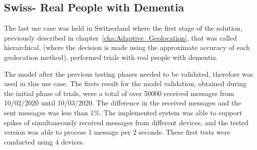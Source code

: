 \subsection{Swiss- Real People with Dementia} %
\label{subsec:Use_case_Swiss}


The last use case was held in Switzerland where the first stage of the solution, previously described in chapter~\ref{cha:Adaptive_Geolocation}, that was called hierarchical, (where the decision is made using the approximate accuracy of each geolocation method), performed trials with real people with dementia. 

The model after the previous testing phases  needed to be validated, therefore was used in this use case. The firsts result for the model validation, obtained during the initial phase of trials, were a total of over 50000 received messages from 10/02/2020 until 10/03/2020. The difference in the received messages and the sent messages was less than 1\%. The implemented system was able to support spikes of simultaneously received messages from different devices, and the tested version was able to process 1 message per 2 seconds. These first tests were conducted using 4 devices.

